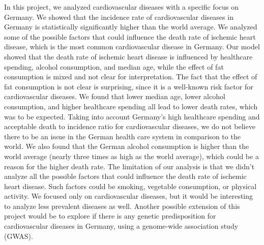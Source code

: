 
In this project, we analyzed cardiovascular diseases with a specific focus on Germany.
We showed that the incidence rate of cardiovascular diseases in Germany is statistically significantly higher than the world average.
We analyzed some of the possible factors that could influence the death rate of ischemic heart disease, which is the most common cardiovascular disease in Germany.
Our model showed that the death rate of ischemic heart disease is influenced by healthcare spending, alcohol consumption, and median age, while 
the effect of fat consumption is mixed and not clear for interpretation. The fact that the effect of fat consumption is not clear is surprising, since it is 
a well-known risk factor for cardiovascular diseases.
We found that lower median age, lower alcohol consumption, and higher healthcare spending
all lead to lower death rates, which was to be expected.
Taking into account Germany's high healthcare spending and acceptable death to incidence ratio for cardiovascular diseases, we do not believe there to be an issue in the German health care system in comparison to the world.
We also found that the German alcohol consumption is higher than the world average (nearly three times as high as the world average), 
which could be a reason for the higher death rate.
The limitation of our analysis is that we didn't analyze all the possible factors that could influence the death rate of ischemic heart disease. 
Such factors could be smoking, vegetable consumption, or physical activity. We focused only on cardiovascular diseases, but it would be interesting to analyze less prevalent diseases as well.
Another possible extension of this project would be to explore if there is any genetic predisposition for cardiovascular diseases in Germany, using a genome-wide association study (GWAS).